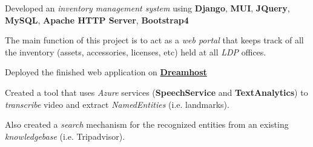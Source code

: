\documentclass[]{openfont}
\begin{document}
\begin{minipage}[t]{0.65\textwidth}
    \begin{tightemize}
        \item Developed an \textit{inventory management system} using \textbf{Django}, \textbf{MUI}, \textbf{JQuery}, \textbf{MySQL}, \textbf{Apache HTTP Server}, \textbf{Bootstrap4}
        \item The main function of this project is to act as a \textit{web portal} that keeps track of all the inventory (assets, accessories, licenses, etc) held at all \textit{LDP} offices.
        \item Deployed the finished web application on \textbf{\href{https://www.dreamhost.com/}{Dreamhost}}
    \end{tightemize}

    \begin{tightemize}
        \item Created a tool that uses \textit{Azure} services (\textbf{SpeechService} and \textbf{TextAnalytics}) to \textit{transcribe} video and extract \textit{NamedEntities} (i.e. landmarks).
        \item Also created a \textit{search} mechanism for the recognized entities from an existing \textit{knowledgebase}  (i.e. Tripadvisor).
    \end{tightemize}

    \sectionsep

\end{minipage}
\end{document}
